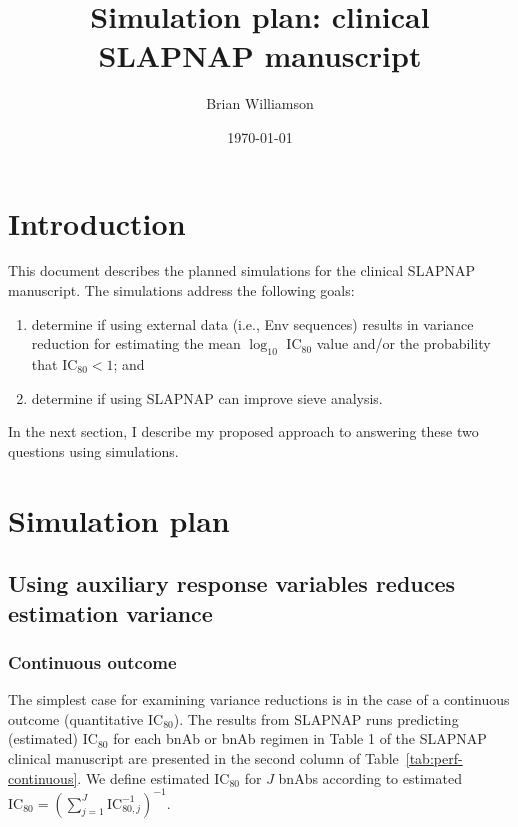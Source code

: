 \documentclass[10pt]{article}
\author{Brian Williamson}
\title{Simulation plan: clinical SLAPNAP manuscript}
\date{\today}
\begin{document}
\maketitle

\section{Introduction}

This document describes the planned simulations for the clinical SLAPNAP manuscript. The simulations address the following goals:
\begin{enumerate}
    \item determine if using external data (i.e., Env sequences) results in variance reduction for estimating the mean $\log_{10}$ IC$_{80}$ value and/or the probability that IC$_{80} < 1$; and
    \item determine if using SLAPNAP can improve sieve analysis.
\end{enumerate}
In the next section, I describe my proposed approach to answering these two questions using simulations.

\section{Simulation plan}
\subsection{Using auxiliary response variables reduces estimation variance}
\subsubsection{Continuous outcome}
The simplest case for examining variance reductions is in the case of a continuous outcome (quantitative IC$_{80}$). The results from SLAPNAP runs predicting (estimated) IC$_{80}$ for each bnAb or bnAb regimen in Table 1 of the SLAPNAP clinical manuscript are presented in the second column of Table~\ref{tab:perf-continuous}. We define estimated IC$_{80}$ for $J$ bnAbs according to estimated $\text{IC}_{80} = \left(\sum_{j=1}^J \text{IC}_{80,j}^{-1}\right)^{-1}$.
\end{document}
